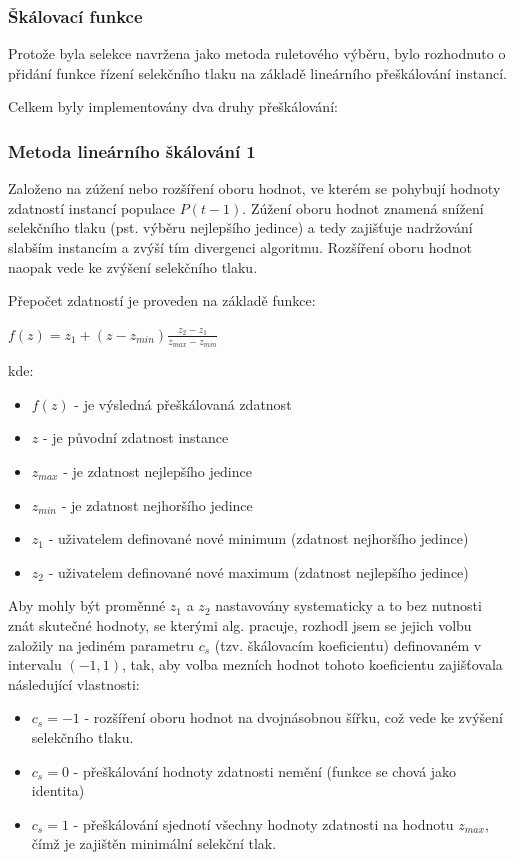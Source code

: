 \documentclass[12pt,oneside,a4paper]{article}
\begin{document}
\subsubsection{Škálovací funkce} Protože byla selekce navržena jako metoda ruletového výběru, bylo rozhodnuto o přidání funkce řízení selekčního tlaku na základě lineárního přeškálování instancí.

Celkem byly implementovány dva druhy přeškálování:

\subsubsection{Metoda lineárního škálování 1}

Založeno na zúžení nebo rozšíření oboru hodnot, ve kterém se pohybují hodnoty zdatností instancí populace $P(t-1)$. Zúžení oboru hodnot znamená snížení selekčního tlaku (pst. výběru nejlepšího jedince) a tedy zajišťuje nadržování slabším instancím a zvýší tím divergenci algoritmu. Rozšíření oboru hodnot naopak vede ke zvýšení selekčního tlaku.

Přepočet zdatností je proveden na základě funkce:

$f(z) = z_1 + (z - z_{min}) \frac{z_2 - z_1}{z_{max} - z_{min}}$

kde:
\begin{itemize}
\item $f(z)$ - je výsledná přeškálovaná zdatnost
\item $z$ - je původní zdatnost instance
\item $z_{max}$ - je zdatnost nejlepšího jedince
\item $z_{min}$ - je zdatnost nejhoršího jedince
\item $z_1$ - uživatelem definované nové minimum (zdatnost nejhoršího jedince)
\item $z_2$ - uživatelem definované nové maximum (zdatnost nejlepšího jedince)
\end{itemize}
Aby mohly být proměnné $z_1$ a $z_2$ nastavovány systematicky a to bez nutnosti znát skutečné hodnoty, se kterými alg. pracuje, rozhodl jsem se jejich volbu založily na jediném parametru $c_s$ (tzv. škálovacím koeficientu) definovaném v intervalu $(-1, 1)$, tak, aby volba mezních hodnot tohoto koeficientu zajišťovala následující vlastnosti:
\begin{itemize}
\item $c_s = -1$ - rozšíření oboru hodnot na dvojnásobnou šířku, což vede ke zvýšení selekčního tlaku.
\item $c_s = 0$ - přeškálování hodnoty zdatnosti nemění (funkce se chová jako identita)
\item $c_s = 1$ - přeškálování sjednotí všechny hodnoty zdatnosti na hodnotu $z_{max}$, čímž je zajištěn minimální selekční tlak.
\end{itemize}
\end{document}
